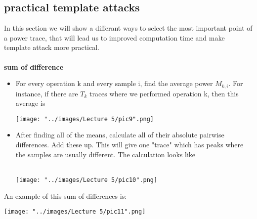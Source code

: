 \documentclass{report}
\begin{document}
    \subsection{practical template attacks}
    In this section we will show a differant ways to select the most important point of a power trace, that will lead us to improved computation time and make template attack more practical.\\
    \\
    \textbf{sum of difference}
       \begin{itemize}
          \item For every operation k and every sample i, find the average power $M_{k, i}$. For instance, if there are $T_k$ traces where we performed operation k, then this average is\\
              \begin{minipage}{\linewidth}
              \centering
              \texttt{[image: "../images/Lecture 5/pic9".png]}
              \end{minipage}
           
          \item After finding all of the means, calculate all of their absolute pairwise differences. Add these up. This will give one "trace" which has peaks where the samples are usually different. The calculation looks like\\
          \\
              \begin{minipage}{\linewidth}
              \centering
              \texttt{[image: "../images/Lecture 5/pic10".png]}
              \end{minipage}
       \end{itemize}
        An example of this sum of differences is:\\
              \begin{minipage}{\linewidth}
              \centering
              \texttt{[image: "../images/Lecture 5/pic11".png]}
              \end{minipage}
        \\
\end{document}
